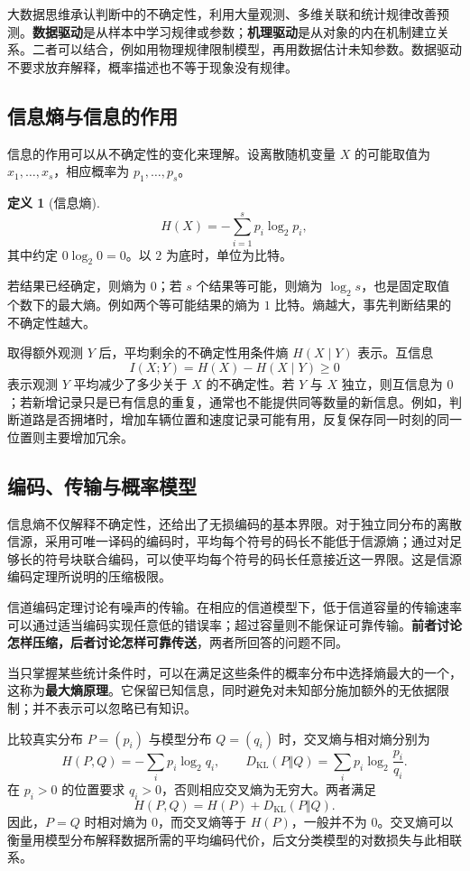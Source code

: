 \documentclass[UTF8,fontset=fandol,a4paper,12pt]{ctexart}
\theoremstyle{definition}
\newtheorem{definition}{定义}[section]
\begin{document}
大数据思维承认判断中的不确定性，利用大量观测、多维关联和统计规律改善预测。\textbf{数据驱动}是从样本中学习规律或参数；\textbf{机理驱动}是从对象的内在机制建立关系。二者可以结合，例如用物理规律限制模型，再用数据估计未知参数。数据驱动不要求放弃解释，概率描述也不等于现象没有规律。

\subsection{信息熵与信息的作用}
信息的作用可以从不确定性的变化来理解。设离散随机变量 $X$ 的可能取值为 $x_1,\ldots,x_s$，相应概率为 $p_1,\ldots,p_s$。
\begin{definition}[信息熵]
\[
 \boxed{H(X)=-\sum_{i=1}^s p_i\log_2 p_i,}
\]
其中约定 $0\log_2 0=0$。以 $2$ 为底时，单位为比特。
\end{definition}
若结果已经确定，则熵为 $0$；若 $s$ 个结果等可能，则熵为 $\log_2 s$，也是固定取值个数下的最大熵。例如两个等可能结果的熵为 $1$ 比特。熵越大，事先判断结果的不确定性越大。

取得额外观测 $Y$ 后，平均剩余的不确定性用条件熵 $H(X\mid Y)$ 表示。互信息
\[
 I(X;Y)=H(X)-H(X\mid Y)\ge0
\]
表示观测 $Y$ 平均减少了多少关于 $X$ 的不确定性。若 $Y$ 与 $X$ 独立，则互信息为 $0$；若新增记录只是已有信息的重复，通常也不能提供同等数量的新信息。例如，判断道路是否拥堵时，增加车辆位置和速度记录可能有用，反复保存同一时刻的同一位置则主要增加冗余。

\subsection{编码、传输与概率模型}
信息熵不仅解释不确定性，还给出了无损编码的基本界限。对于独立同分布的离散信源，采用可唯一译码的编码时，平均每个符号的码长不能低于信源熵；通过对足够长的符号块联合编码，可以使平均每个符号的码长任意接近这一界限。这是信源编码定理所说明的压缩极限。

信道编码定理讨论有噪声的传输。在相应的信道模型下，低于信道容量的传输速率可以通过适当编码实现任意低的错误率；超过容量则不能保证可靠传输。\textbf{前者讨论怎样压缩，后者讨论怎样可靠传送}，两者所回答的问题不同。

当只掌握某些统计条件时，可以在满足这些条件的概率分布中选择熵最大的一个，这称为\textbf{最大熵原理}。它保留已知信息，同时避免对未知部分施加额外的无依据限制；并不表示可以忽略已有知识。

比较真实分布 $P=(p_i)$ 与模型分布 $Q=(q_i)$ 时，交叉熵与相对熵分别为
\[
 H(P,Q)=-\sum_i p_i\log_2 q_i,\qquad
 D_{\mathrm{KL}}(P\Vert Q)=\sum_i p_i\log_2\frac{p_i}{q_i}.
\]
在 $p_i>0$ 的位置要求 $q_i>0$，否则相应交叉熵为无穷大。两者满足
\[
 \boxed{H(P,Q)=H(P)+D_{\mathrm{KL}}(P\Vert Q).}
\]
因此，$P=Q$ 时相对熵为 $0$，而交叉熵等于 $H(P)$，一般并不为 $0$。交叉熵可以衡量用模型分布解释数据所需的平均编码代价，后文分类模型的对数损失与此相联系。
\end{document}

